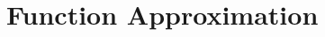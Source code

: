 \documentclass[../main.tex]{subfiles}
\begin{document}
	\chapter{Function Approximation} \label{ch:function}
\end{document}
